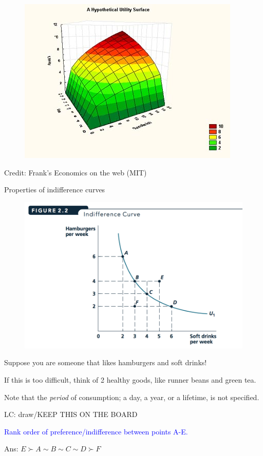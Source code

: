 \documentclass[table]{beamer}
\begin{document}
\begin{frame}

\begin{figure}

{\centering \includegraphics[width=0.8\linewidth]{picsfigs/indif_utility_2_400} 

}

\end{figure}

Credit: Frank's Economics on the web (MIT)

\end{frame}

\begin{frame}{Properties of indifference curves}
\protect\hypertarget{properties-of-indifference-curves}{}

\begin{figure}

{\centering \includegraphics[width=0.8\linewidth]{picsfigs/indifccurve} 

}

\end{figure}

Suppose you are someone that likes hamburgers and soft drinks!

If this is too difficult, think of 2 healthy goods, like runner beans
and green tea.

Note that the \emph{period} of consumption; a day, a year, or a
lifetime, is not specified.

LC: draw/KEEP THIS ON THE BOARD

\textcolor{blue}{Rank order of preference/indifference between points A-E.}

Ans: \(E \succ A \sim B \sim C \sim D \succ F\)

\end{frame}
\end{document}

